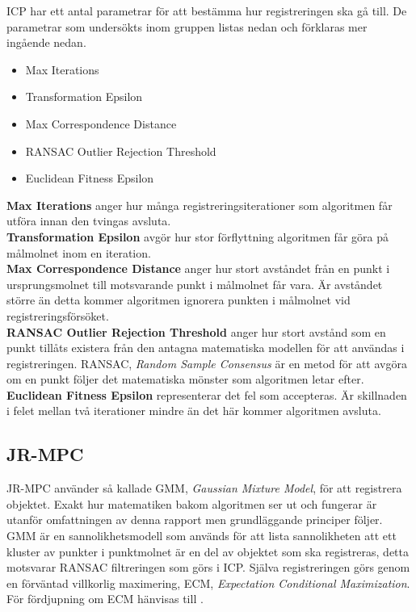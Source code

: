 ICP har ett antal parametrar för att bestämma hur registreringen ska gå till. De parametrar som undersökts inom gruppen listas nedan och förklaras mer ingående nedan.
\begin{itemize}
	\item Max Iterations
	\item Transformation Epsilon
	\item Max Correspondence Distance
	\item RANSAC Outlier Rejection Threshold
	\item Euclidean Fitness Epsilon
\end{itemize}
\textbf{Max Iterations} anger hur många registrerings\-iterationer som algoritmen får utföra innan den tvingas avsluta.\\
\textbf{Transformation Epsilon} avgör hur stor förflyttning algoritmen får göra på målmolnet inom en iteration.\\
\textbf{Max Correspondence Distance} anger hur stort avståndet från en punkt i ursprungsmolnet till motsvarande punkt i målmolnet får vara. Är avståndet större än detta kommer algoritmen ignorera punkten i målmolnet vid registreringsförsöket.\\
\textbf{RANSAC Outlier Rejection Threshold} anger hur stort avstånd som en punkt tillåts existera från den antagna matematiska modellen för att användas i registreringen. RANSAC, \textit{Random Sample Consensus} är en metod för att avgöra om en punkt följer det matematiska mönster som algoritmen letar efter.\\
\textbf{Euclidean Fitness Epsilon} representerar det fel som accepteras. Är skillnaden i felet mellan två iterationer mindre än det här kommer algoritmen avsluta.

\subsection{JR-MPC}
JR-MPC använder så kallade GMM, \textit{Gaussian Mixture Model}, för att registrera objektet. Exakt hur matematiken bakom algoritmen ser ut och fungerar är utanför omfattningen av denna rapport men grundläggande principer följer. GMM är en sannolikhetsmodell som används för att lista sannolikheten att ett kluster av punkter i punktmolnet är en del av objektet som ska registreras, detta motsvarar RANSAC filtreringen som görs i ICP. Själva registreringen görs genom en förväntad villkorlig maximering, ECM, \textit{Expectation Conditional Maximization}. För fördjupning om ECM hänvisas till \cite{}.

